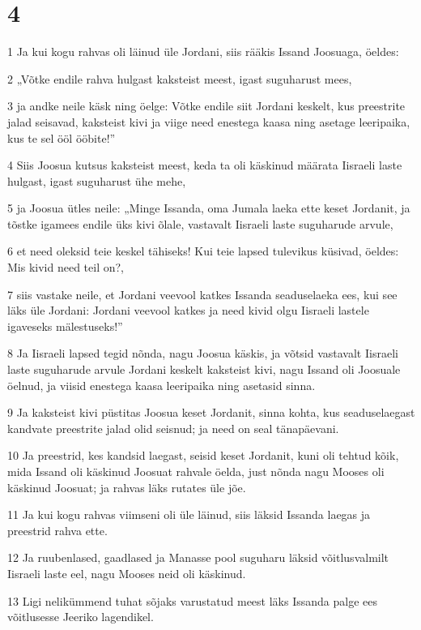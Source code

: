 \chapter{4}

\par 1 Ja kui kogu rahvas oli läinud üle Jordani, siis rääkis Issand Joosuaga, öeldes:
\par 2 „Võtke endile rahva hulgast kaksteist meest, igast suguharust mees,
\par 3 ja andke neile käsk ning öelge: Võtke endile siit Jordani keskelt, kus preestrite jalad seisavad, kaksteist kivi ja viige need enestega kaasa ning asetage leeripaika, kus te sel ööl ööbite!”
\par 4 Siis Joosua kutsus kaksteist meest, keda ta oli käskinud määrata Iisraeli laste hulgast, igast suguharust ühe mehe,
\par 5 ja Joosua ütles neile: „Minge Issanda, oma Jumala laeka ette keset Jordanit, ja tõstke igamees endile üks kivi õlale, vastavalt Iisraeli laste suguharude arvule,
\par 6 et need oleksid teie keskel tähiseks! Kui teie lapsed tulevikus küsivad, öeldes: Mis kivid need teil on?,
\par 7 siis vastake neile, et Jordani veevool katkes Issanda seaduselaeka ees, kui see läks üle Jordani: Jordani veevool katkes ja need kivid olgu Iisraeli lastele igaveseks mälestuseks!”
\par 8 Ja Iisraeli lapsed tegid nõnda, nagu Joosua käskis, ja võtsid vastavalt Iisraeli laste suguharude arvule Jordani keskelt kaksteist kivi, nagu Issand oli Joosuale öelnud, ja viisid enestega kaasa leeripaika ning asetasid sinna.
\par 9 Ja kaksteist kivi püstitas Joosua keset Jordanit, sinna kohta, kus seaduselaegast kandvate preestrite jalad olid seisnud; ja need on seal tänapäevani.
\par 10 Ja preestrid, kes kandsid laegast, seisid keset Jordanit, kuni oli tehtud kõik, mida Issand oli käskinud Joosuat rahvale öelda, just nõnda nagu Mooses oli käskinud Joosuat; ja rahvas läks rutates üle jõe.
\par 11 Ja kui kogu rahvas viimseni oli üle läinud, siis läksid Issanda laegas ja preestrid rahva ette.
\par 12 Ja ruubenlased, gaadlased ja Manasse pool suguharu läksid võitlusvalmilt Iisraeli laste eel, nagu Mooses neid oli käskinud.
\par 13 Ligi nelikümmend tuhat sõjaks varustatud meest läks Issanda palge ees võitlusesse Jeeriko lagendikel.
